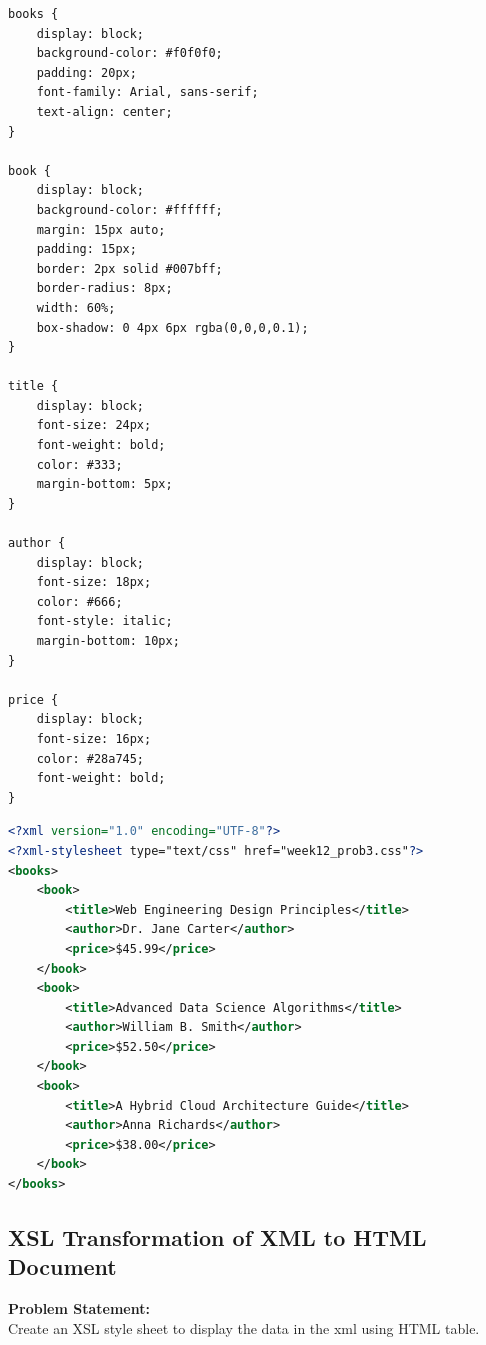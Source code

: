 \documentclass[a4paper,12pt]{article}
\begin{document}
\begin{lstlisting}[language=HTML, caption={Designing external week12\_prob3.css}]
books {
    display: block;
    background-color: #f0f0f0;
    padding: 20px;
    font-family: Arial, sans-serif;
    text-align: center;
}

book {
    display: block;
    background-color: #ffffff;
    margin: 15px auto;
    padding: 15px;
    border: 2px solid #007bff;
    border-radius: 8px;
    width: 60%;
    box-shadow: 0 4px 6px rgba(0,0,0,0.1);
}

title {
    display: block;
    font-size: 24px;
    font-weight: bold;
    color: #333;
    margin-bottom: 5px;
}

author {
    display: block;
    font-size: 18px;
    color: #666;
    font-style: italic;
    margin-bottom: 10px;
}

price {
    display: block;
    font-size: 16px;
    color: #28a745;
    font-weight: bold;
}
\end{lstlisting}

\begin{lstlisting}[language=XML, caption={Targeting the stylesheet directly out of week12\_prob3.xml}]
<?xml version="1.0" encoding="UTF-8"?>
<?xml-stylesheet type="text/css" href="week12_prob3.css"?>
<books>
    <book>
        <title>Web Engineering Design Principles</title>
        <author>Dr. Jane Carter</author>
        <price>$45.99</price>
    </book>
    <book>
        <title>Advanced Data Science Algorithms</title>
        <author>William B. Smith</author>
        <price>$52.50</price>
    </book>
    <book>
        <title>A Hybrid Cloud Architecture Guide</title>
        <author>Anna Richards</author>
        <price>$38.00</price>
    </book>
</books>
\end{lstlisting}

\subsection{XSL Transformation of XML to HTML Document}
\textbf{Problem Statement:} \\
Create an XSL style sheet to display the data in the xml using HTML table.
\end{document}
